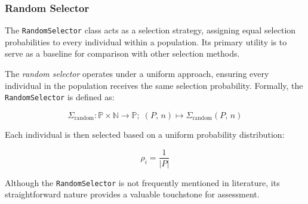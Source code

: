 \subsubsection{Random Selector}
\label{sec:keen:operators:selection:random}
  The \texttt{RandomSelector} class acts as a selection strategy, assigning 
  equal selection probabilities to every individual within a population.
  Its primary utility is to serve as a baseline for comparison with other 
  selection methods.

  \begin{definition}
  \label{def:keen:operators:selection:random}
    The \emph{random selector} operates under a uniform approach, ensuring every 
    individual in the population receives the same selection probability. 
    Formally, the \texttt{RandomSelector} is defined as:

    \begin{equation}
      \Sigma_{\mathrm{random}} : 
        \mathbb{P} \times \mathbb{N} \to \mathbb{P};\; 
      (P,\, n) \mapsto \Sigma_{\mathrm{random}}(P,\, n)  
    \end{equation}

    Each individual is then selected based on a uniform probability 
    distribution:

    \begin{equation}
      \rho_i = \frac{1}{|P|}
    \end{equation}
  \end{definition}

  Although the \texttt{RandomSelector} is not frequently mentioned in 
  literature, its straightforward nature provides a valuable touchstone for 
  assessment.


